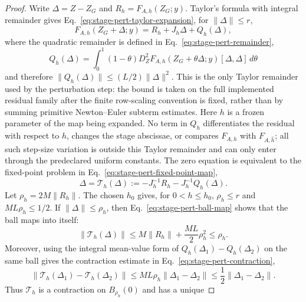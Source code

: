 \documentclass[preprint,12pt]{elsarticle}
\begin{document}
\begin{proof}
Write $\Delta=Z-Z_G$ and $R_h=F_{A,h}(Z_G;y)$. Taylor's formula with integral
remainder gives Eq.~\eqref{eq:stage-pert-taylor-expansion}, for
$\|\Delta\|\le r$,
\begin{equation}
\label{eq:stage-pert-taylor-expansion}
  F_{A,h}(Z_G+\Delta;y)
  =R_h+J_h\Delta+Q_h(\Delta),
\end{equation}
where the quadratic remainder is defined in
Eq.~\eqref{eq:stage-pert-remainder},
\begin{equation}
\label{eq:stage-pert-remainder}
  Q_h(\Delta)
  =
  \int_0^1(1-\theta)
  D_Z^2F_{A,h}(Z_G+\theta\Delta;y)[\Delta,\Delta]\,d\theta
\end{equation}
and therefore $\|Q_h(\Delta)\|\le (L/2)\|\Delta\|^2$.  This is the only
Taylor remainder used by the perturbation step: the bound is taken on the
full implemented residual family after the finite row-scaling convention is
fixed, rather than by summing primitive Newton--Euler subterm estimates.
Here \(h\) is a frozen parameter of the map being expanded.  No term in
\(Q_h\) differentiates the residual with respect to \(h\), changes the stage
abscissae, or compares \(F_{A,h}\) with \(F_{A,\hat h}\); all such
step-size variation is outside this Taylor remainder and can only enter
through the predeclared uniform constants.  The zero equation is
equivalent to the fixed-point problem in
Eq.~\eqref{eq:stage-pert-fixed-point-map},
\begin{equation}
\label{eq:stage-pert-fixed-point-map}
  \Delta
  =
  \mathcal T_h(\Delta)
  :=
  -J_h^{-1}R_h-J_h^{-1}Q_h(\Delta).
\end{equation}
Let $\rho_h=2M\|R_h\|$.  The chosen \(h_0\) gives, for \(0<h\le h_0\),
$\rho_h\le r$ and $ML\rho_h\le 1/2$.  If $\|\Delta\|\le\rho_h$, then
Eq.~\eqref{eq:stage-pert-ball-map} shows that the ball maps into itself:
\begin{equation}
\label{eq:stage-pert-ball-map}
  \|\mathcal T_h(\Delta)\|
  \le M\|R_h\|+\frac{ML}{2}\rho_h^2
  \le \rho_h .
\end{equation}
Moreover, using the integral mean-value form of $Q_h(\Delta_1)-Q_h(\Delta_2)$
on the same ball gives the contraction estimate in
Eq.~\eqref{eq:stage-pert-contraction},
\begin{equation}
\label{eq:stage-pert-contraction}
  \|\mathcal T_h(\Delta_1)-\mathcal T_h(\Delta_2)\|
  \le ML\rho_h\|\Delta_1-\Delta_2\|
  \le \frac12\|\Delta_1-\Delta_2\|.
\end{equation}
Thus $\mathcal T_h$ is a contraction on $B_{\rho_h}(0)$ and has a unique

\end{proof}
\end{document}
